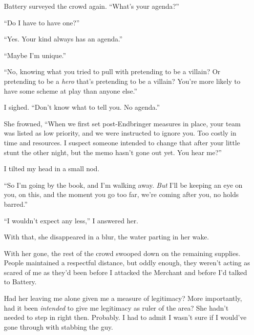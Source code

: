 Battery surveyed the crowd again.  ``What's your agenda?''



``Do I have to have one?''



``Yes.  Your kind always has an agenda.''



``Maybe I'm unique.''



``No, knowing what you tried to pull with pretending to be a villain?  Or pretending to be a \emph{hero} that's pretending to be a villain?  You're more likely to have some scheme at play than anyone else.''



I sighed.  ``Don't know what to tell you.  No agenda.''



She frowned, ``When we first set post-Endbringer measures in place, your team was listed as low priority, and we were instructed to ignore you.  Too costly in time and resources.  I suspect someone intended to change that after your little stunt the other night, but the memo hasn't gone out yet.  You hear me?''



I tilted my head in a small nod.



``So I'm going by the book, and I'm walking away.  \emph{But} I'll be keeping an eye on you, on this, and the moment you go too far, we're coming after you, no holds barred.''



``I wouldn't expect any less,'' I answered her.



With that, she disappeared in a blur, the water parting in her wake.



With her gone, the rest of the crowd swooped down on the remaining supplies.  People maintained a respectful distance, but oddly enough, they weren't acting as scared of me as they'd been before I attacked the Merchant and before I'd talked to Battery.



Had her leaving me alone given me a measure of legitimacy?  More importantly, had it been \emph{intended} to give me legitimacy as ruler of the area?  She hadn't needed to step in right then.  Probably.  I had to admit I wasn't sure if I would've gone through with stabbing the guy.



